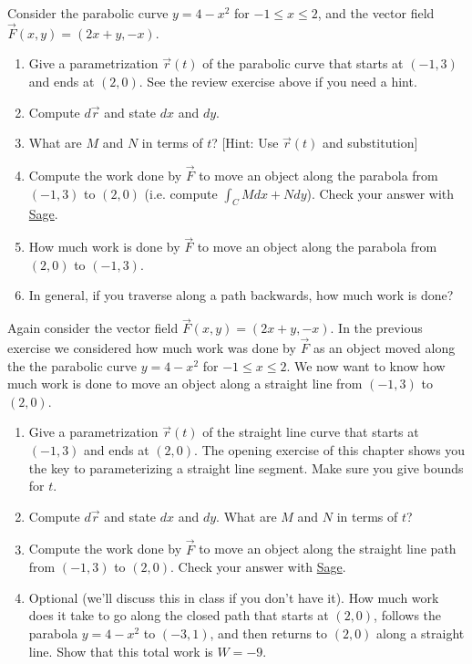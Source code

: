 \begin{problem}
%
 Consider the parabolic curve $y=4-x^2$ for $-1\leq x\leq 2$, and the vector field $\vec F(x,y) = (2x+y,-x)$. 
\begin{enumerate}
	\item Give a parametrization $\vec r(t)$ of the parabolic curve that starts at $(-1,3)$ and ends at $(2,0)$.  See the review exercise above if you need a hint.
	\item Compute $d\vec r$ and state $dx$ and $dy$. 
	\item What are $M$ and $N$ in terms of $t$? [Hint: Use $\vec r (t)$ and substitution]
	\item Compute the work done by $\vec F$ to move an object along the parabola from $(-1,3)$ to $(2,0)$ (i.e. compute $\int _C Mdx+Ndy$). Check your answer with \href{\sageworkurl}{Sage}. 
	\item How much work is done by $\vec F$ to move an object along the parabola from $(2,0)$ to $(-1,3)$.  
	\item In general, if you traverse along a path backwards, how much work is done?  
\end{enumerate}
\end{problem}

\begin{problem}
 Again consider the vector field $\vec F(x,y) = (2x+y,-x)$. In the previous exercise we considered how much work was done by $\vec F$ as an object moved along the the parabolic curve $y=4-x^2$ for $-1\leq x\leq 2$. We now want to know how much work is done to move an object along a straight line from $(-1,3)$ to $(2,0)$.    
\begin{enumerate}
 \item Give a parametrization $\vec r(t)$ of the straight line curve that starts at $(-1,3)$ and ends at $(2,0)$. The opening exercise of this chapter shows you the key to parameterizing a straight line segment.  Make sure you give bounds for $t$. 
 \item Compute $d\vec r$ and state $dx$ and $dy$. What are $M$ and $N$ in terms of $t$?
 \item Compute the work done by $\vec F$ to move an object along the straight line path from $(-1,3)$ to $(2,0)$. Check your answer with \href{\sageworkurl}{Sage}. 
 \item Optional (we'll discuss this in class if you don't have it).  How much work does it take to go along the closed path that starts at $(2,0)$, follows the parabola $y=4-x^2$ to $(-3,1)$, and then returns to $(2,0)$ along a straight line. Show that this total work is $W=-9$.   
\end{enumerate}
\end{problem}



